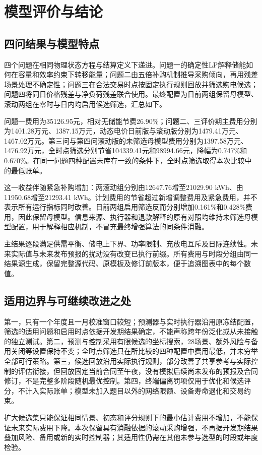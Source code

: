 \section{模型评价与结论}

\subsection{四问结果与模型特点}

四个问题在相同物理状态方程与结算定义下递进。问题一的确定性LP解释储能如何在容量和效率约束下转移能量；问题二由五倍补购机制推导采购倾向，再用残差场景处理不确定性；问题三在合法交易时点按固定执行规则回放并筛选购电候选；问题四将同日价格残差与净负荷残差联合使用。最终配置为日前两组保留母模型、滚动两组在零时与日内均启用候选筛选，汇总如下。



问题一费用为35126.95元，相对无储能节费26.90\%；问题二、三评价期主费用分别为1401.28万元、1387.15万元，动态电价日前版与滚动版分别为1479.41万元、1467.02万元。第三问与第四问滚动版的未筛选母模型费用分别为1397.58万元、1476.92万元，全时点筛选分别节省104339.41元和98994.66元，降幅为0.747\%和0.670\%。在同一问题四种配置末库存一致的条件下，全时点筛选取得本次比较中的最低账单。

这一收益伴随紧急补购增加：两滚动组分别由12647.76增至21029.90 kWh、由11950.68增至21293.41 kWh。计划费用的节省超过新增调整费用及紧急费用，并不表示所有运行指标同时改善。日前两组启用筛选反而分别增加0.161\%和0.428\%费用，因此保留母模型。信息来源、执行器和退款解释的原有对照均维持未筛选母模型配置，用于解释相应机制，不冒充最终增强算法的同条件消融。

主结果逐段满足供需平衡、储电上下界、功率限制、充放电互斥及日际连续性。未来实际值与未来发布预报的扰动没有改变已执行前缀。所有费用与时段分组由同一结果源生成，保留完整源代码、原模板及修订前版本，便于追溯图表中的每个数值。

\subsection{适用边界与可继续改进之处}

第一，只有一个年度且一月校准窗口较短；预测器与实时执行器沿用原冻结配置，筛选的适用问题和启用时点依据开发期结果确定，不能声称跨年份泛化或从未接触的独立测试。第二，预测与控制采用有限候选的坐标搜索，28场景、额外风险与备用关闭等设置保持不变；全时点筛选只在所比较的四种配置中费用最低，并未穷举全部可行策略。第三，候选回放沿用实际执行规则，部分改善了共享参考与实际控制的评估衔接，但回放固定当前合同至午夜，没有模拟后续尚未发布的预报及合同修订，不是完整多阶段随机最优控制。第四，终端偏离罚项仅用于优化和候选评分，不计入实际账单；模型未加入题目以外的网络限额、设备寿命退化和交易约束。

扩大候选集只能保证相同情景、初态和评分规则下的最小估计费用不增加，不能保证未来实际费用下降。本次保留具有消融依据的滚动采购增强，不再据开发期结果叠加风险、备用或新的实时控制器；其适用性仍需在其他未参与选型的时段或年度检验。

